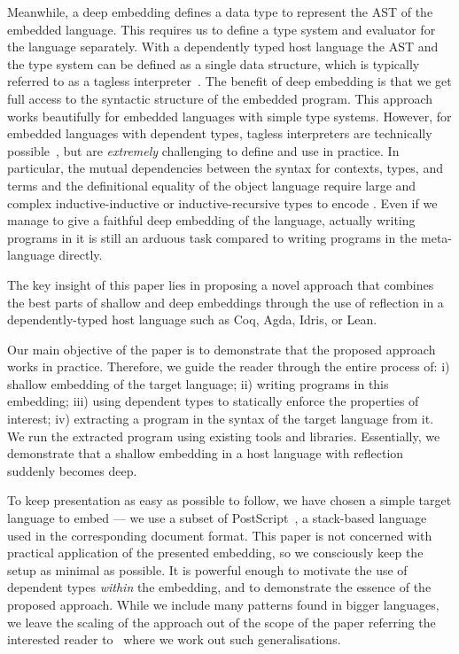 \documentclass[sigplan,screen]{acmart}
\newcommand{\myref}[2]{\hyperref[#2]{#1~\ref*{#2}}}
\newcommand{\figref}[1]{\myref{Fig.}{fig:#1}}%
\begin{document}
Meanwhile, a deep embedding defines a data type to represent the AST
of the embedded language.  This requires us to define a type system
and evaluator for the language separately.  With a dependently typed
host language the AST and the type system can be defined as a single
data structure, which is typically referred to as a tagless
interpreter~\citep{PasalicTS02,Tagless}.  The benefit of deep embedding is that we get
full access to the syntactic structure of the embedded program.  This
approach works beautifully for embedded languages with simple type
systems. However, for embedded languages with dependent types, tagless
interpreters are technically
possible~\citep{CHAPMAN200921,10.1007/978-3-540-74464-1_7}, but are
\emph{extremely} challenging to define and use in practice.
%
In particular, the mutual dependencies between the syntax for
contexts, types, and terms and the definitional equality of the object
language require large and complex inductive-inductive or
inductive-recursive types to encode
\cite{10.1007/978-3-540-74464-1_7,CHAPMAN200921,10.1145/1863495.1863497}.
%
Even if we manage to give a faithful deep embedding of the language,
actually writing programs in it is still an arduous task compared
to writing programs in the meta-language directly.

The key insight of this paper lies in proposing a novel approach that
combines the best parts of shallow and deep embeddings through the use
of reflection in a
dependently-typed host language such as Coq, Agda, Idris, or Lean.

Our main objective of the paper is to demonstrate that the
proposed approach works in practice.  Therefore, we guide the reader
through the entire process of: i) shallow embedding of the target
language;  ii) writing programs in this embedding; iii) using
dependent types to statically enforce the properties of interest;
iv) extracting a program in the syntax of the target language
from it.  We run the extracted program using existing
tools and libraries. Essentially, we demonstrate that a
shallow embedding in a host language with reflection
suddenly becomes deep.

% 

To keep presentation as easy as possible to follow, we have
chosen a simple target language to embed --- we use a subset
of PostScript~\citep{postscript1999language}, a stack-based
language used in the corresponding document format.
%
%
This paper is not concerned with practical application of
the presented embedding, so we consciously keep the setup as minimal as
possible.  It is powerful enough to motivate the use of dependent
types \emph{within} the embedding, and to demonstrate the essence
of the proposed approach.  While we include many patterns found
in bigger languages, we leave the scaling of the approach out
of the scope of the paper referring the interested reader
to~\cite{DBLP:journals/corr/abs-2105-10819} where we work
out such generalisations.
\end{document}
